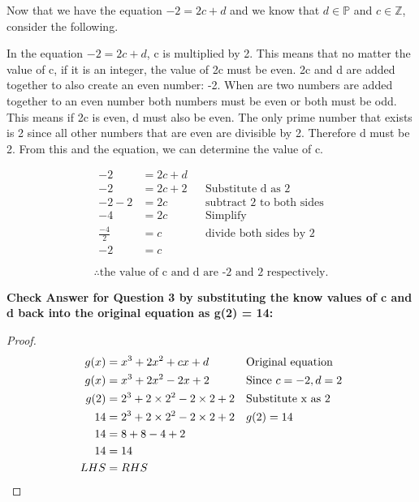 \documentclass[12pt]{book}
\begin{document}
\begin{enumerate}
\vspace{-1cm}

Now that we have the equation $-2 = 2c + d$ and we know that $d \in \mathbb{P}$ and $c \in \mathbb{Z}$, consider the following.

In the equation $-2 = 2c + d$, c is multiplied by 2. This means 
that no matter the value of c, if it is an integer, the value 
of 2c must be even. 2c and d are added together to also create 
an even number: -2. When are two numbers are added together to 
an even number both numbers must be even or both must be odd. 
This means if 2c is even, d must also be even. The only prime 
number that exists is 2 since all other numbers that are even 
are divisible by 2. Therefore d must be 2. From this and the 
equation, we can determine the value of c.

\vspace{-0.6cm}

\begin{align*}
    -2 &= 2c + d \\
    -2 &= 2c + 2 && \text{Substitute d as 2} \\
    -2 - 2 &= 2c && \text{subtract 2 to both sides}\\
    -4 &= 2c && \text{Simplify} \\
    \frac{-4}{2} &= c && \text{divide both sides by 2} \\
    -2 &= c
\end{align*}

$$\boxed{\therefore \text{the value of c and d are -2 and 2 respectively.}}$$

\newpage

\textbf{Check Answer for Question 3 by substituting the know values of c and d back into the original equation as g(2) = 14:}

\begin{proof}
    \begin{align*}
        g(x) &= x^3 + 2x^2 + cx + d && \text{Original equation}\\
        g(x) &= x^3 + 2x^2 - 2x + 2 && \text{Since }c = -2, d = 2\\
        g(2) &= 2^3 + 2\times 2^2 - 2\times 2 + 2 && \text{Substitute x as 2}\\
        14 &= 2^3 + 2\times 2^2 - 2\times 2 + 2 && g(2) = 14\\
        14 &= 8 + 8 - 4 + 2\\
        14 &= 14 \\
        LHS &= RHS && \qedhere\\
    \end{align*}
\end{proof}


\end{enumerate}
\end{document}
